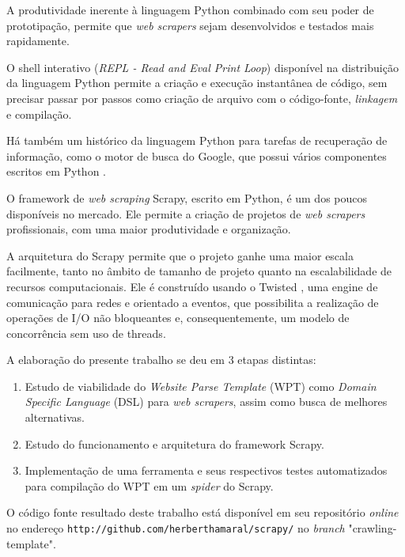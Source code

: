 A produtividade inerente à linguagem Python combinado com seu poder de prototipação, permite que \emph{web scrapers} sejam desenvolvidos e testados mais rapidamente.

O shell interativo (\emph{REPL - Read and Eval Print Loop}) disponível na distribuição da linguagem Python permite a criação e execução instantânea de código, sem precisar passar por passos como criação de arquivo com o código-fonte, \emph{linkagem} e compilação.

Há também um histórico da linguagem Python para tarefas de recuperação de informação, como o motor de busca do Google, que possui vários componentes escritos em Python \cite{google}.

O framework de \emph{web scraping} Scrapy, escrito em Python, é um dos poucos disponíveis no mercado. Ele permite a criação de projetos de \emph{web scrapers} profissionais, com uma maior produtividade e organização.

A arquitetura do Scrapy permite que o projeto ganhe uma maior escala facilmente, tanto no âmbito de tamanho de projeto quanto na escalabilidade de recursos computacionais. Ele é construído usando o Twisted \cite{twisted}, uma engine de comunicação para redes e orientado a eventos, que possibilita a realização de operações de I/O não bloqueantes e, consequentemente, um modelo de concorrência sem uso de threads. 

A elaboração do presente trabalho se deu em 3 etapas distintas:

\begin{enumerate}
	\item Estudo de viabilidade do \emph{Website Parse Template} (WPT) como \emph{Domain Specific Language} (DSL) para \emph{web scrapers}, assim como busca de melhores alternativas.
	\item Estudo do funcionamento e arquitetura do framework Scrapy.
	\item Implementação de uma ferramenta e seus respectivos testes automatizados para compilação do WPT em um \emph{spider} do Scrapy.
\end{enumerate}

O código fonte resultado deste trabalho está disponível em seu repositório \emph{online} no endereço \texttt{http://github.com/herberthamaral/scrapy/} no \emph{branch} "crawling-template".